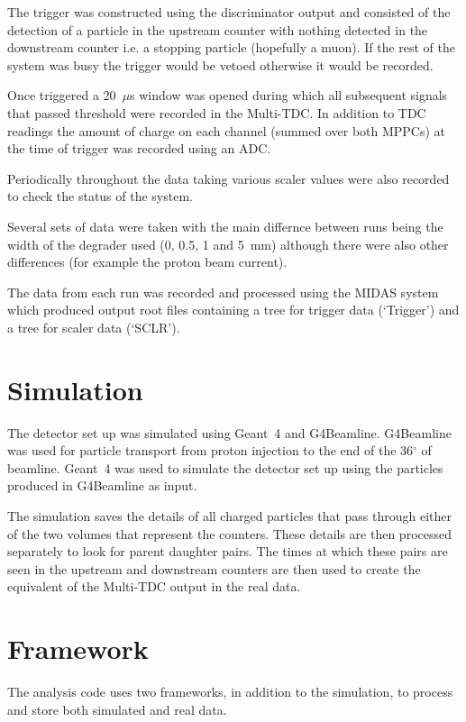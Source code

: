 \documentclass[]{article}
\newcommand{\ms}{$\mu$s}
\begin{document}
The trigger was constructed using the discriminator output and consisted of the detection of a particle in the upstream counter with nothing detected in the downstream counter i.e. a stopping particle (hopefully a muon). If the rest of the system was busy the trigger would be vetoed otherwise it would be recorded. 

Once triggered a  20~\ms{}  window was opened during which all subsequent signals that passed threshold were recorded in the Multi-TDC. In addition to TDC readings the amount of charge on each channel (summed over both MPPCs) at the time of trigger was recorded using an ADC.

Periodically throughout the data taking various scaler values were also recorded to check the status of the system.

Several sets of data were taken with the main differnce between runs being the width of the degrader used (0, 0.5, 1 and 5~mm) although there were also other differences (for example the proton beam current).

The data from each run was recorded and processed using the MIDAS system which produced output root files containing a tree for trigger data (`Trigger') and a tree for scaler data (`SCLR'). 

\section{Simulation}\label{sec:simulation}
The detector set up was simulated using Geant~4 and G4Beamline. G4Beamline was used for particle transport from proton injection to the end of the 36$^{\circ}$ of beamline. Geant~4 was used to simulate the detector set up using the particles produced in G4Beamline as input.

The simulation saves the details of all charged particles that pass through either of the two volumes that represent the counters. These details are then processed separately to look for parent daughter pairs. The times at which these pairs are seen in the upstream and downstream counters are then used to create the equivalent of the Multi-TDC output in the real data.

\section{Framework}\label{sec:framework}
The analysis code uses two frameworks, in addition to the simulation, to process and store both simulated and real data. 
\end{document}
